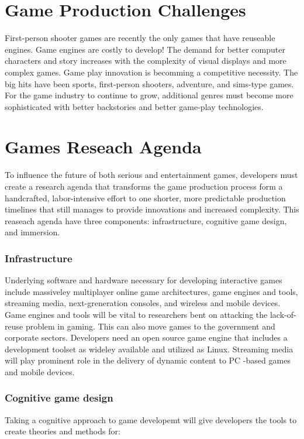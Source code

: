     \section*{Game Production Challenges}
    First-person shooter games are recently the only games that have reuseable engines. Game engines are costly to develop! The demand for better computer characters and story increases with the complexity of visual displays and more complex games. Game play innovation is becomming a competitive necessity. The big hits have been sports, first-person shooters, adventure, and sims-type games. For the game industry to continue to grow, additional genres must become more sophisticated with better backstories and better game-play technologies. 

    \section*{Games Reseach Agenda}
    To influence the future of both serious and entertainment games, developers must create a research agenda that transforms the game production process form a handcrafted, labor-intensive effort to one shorter, more predictable production timelines that still manages to provide innovations and increased complexity. This reaseach agenda have three components: infrastructure, cognitive game design, and immersion.

      \subsubsection*{Infrastructure}
      Underlying software and hardware necessary for developing interactive games include massiveley multiplayer online game architectures, game engines and tools, streaming media, next-greneration consoles, and wireless and mobile devices. Game engines and tools will be vital to researchers bent on attacking the lack-of-reuse problem in gaming. This can also move games to the government and corporate sectors. Developers need an open source game engine that includes a development toolset as wideley available and utilized as Linux. Streaming media will play prominent role in the delivery of dynamic content to PC -based games and mobile devices. 

      \subsubsection*{Cognitive game design}
      Taking a cognitive approach to game developemt will give developers the tools to create theories and methods for:

